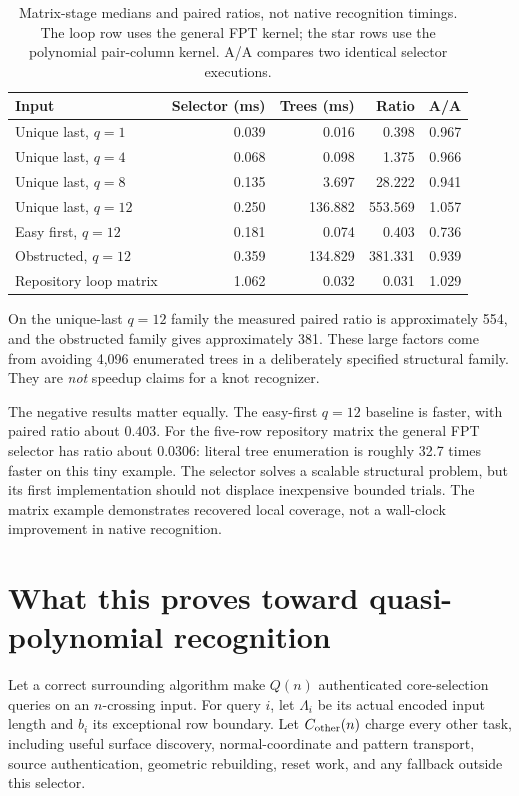 \documentclass[11pt,letterpaper]{article}
\theoremstyle{definition}
\theoremstyle{remark}
\newcommand{\UniqueLastRatio}{554}
\newcommand{\ObstructedRatio}{381}
\newcommand{\EasyFirstRatio}{0.403}
\newcommand{\LoopRatio}{0.0306}
\newcommand{\LoopSlowdown}{32.7}
\begin{document}
\begin{table}[htbp]\centering\small
\begin{tabular}{lrrrr}\toprule
Input & Selector (ms) & Trees (ms) & Ratio & A/A\\\midrule
Unique last, $q=1$ & 0.039 & 0.016 & 0.398 & 0.967\\
Unique last, $q=4$ & 0.068 & 0.098 & 1.375 & 0.966\\
Unique last, $q=8$ & 0.135 & 3.697 & 28.222 & 0.941\\
Unique last, $q=12$ & 0.250 & 136.882 & 553.569 & 1.057\\
Easy first, $q=12$ & 0.181 & 0.074 & 0.403 & 0.736\\
Obstructed, $q=12$ & 0.359 & 134.829 & 381.331 & 0.939\\
Repository loop matrix & 1.062 & 0.032 & 0.031 & 1.029\\
\bottomrule\end{tabular}
\caption{Matrix-stage medians and paired ratios, not native recognition timings. The loop row uses the general FPT kernel; the star rows use the polynomial pair-column kernel. A/A compares two identical selector executions.}
\end{table}

On the unique-last $q=12$ family the measured paired ratio is approximately
\UniqueLastRatio{}, and the obstructed family gives approximately \ObstructedRatio{}. These large factors
come from avoiding 4,096 enumerated trees in a deliberately specified structural
family. They are \emph{not} speedup claims for a knot recognizer.

The negative results matter equally. The easy-first $q=12$ baseline is faster,
with paired ratio about $\EasyFirstRatio$. For the five-row repository matrix the general
FPT selector has ratio about $\LoopRatio$: literal tree enumeration is roughly
\LoopSlowdown{} times faster on this tiny example. The selector solves a scalable structural
problem, but its first implementation should not displace inexpensive bounded
trials. The matrix example demonstrates recovered local coverage, not a
wall-clock improvement in native recognition.

\section{What this proves toward quasi-polynomial recognition}\label{sec:global}
Let a correct surrounding algorithm make $Q(n)$ authenticated core-selection
queries on an $n$-crossing input. For query $i$, let $\Lambda_i$ be its actual
encoded input length and $b_i$ its exceptional row boundary. Let $C_{\rm other}(n)$
charge every other task, including useful surface discovery, normal-coordinate
and pattern transport, source authentication, geometric rebuilding, reset work,
and any fallback outside this selector.
\end{document}

